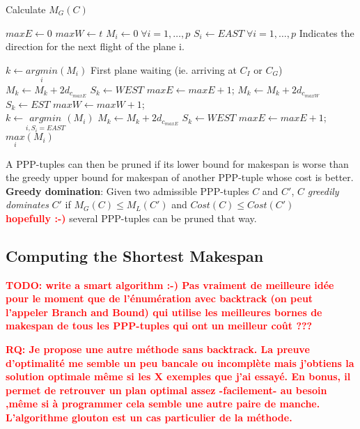 \documentclass[a4paper,11pt]{article}
\newcommand{\myred}[1]
{\textcolor{red}{\bf {#1}}
}
\begin{document}
\begin{algorithm}
\caption{Calculate $M_G(C)$}
\begin{algorithmic}
\STATE $maxE \leftarrow 0$
\STATE $maxW \leftarrow t$
\STATE $M_i \leftarrow 0 \; \forall i=1,\ldots,p$
\STATE $S_i \leftarrow EAST \; \forall i=1,\ldots,p$
\COMMENT Indicates the direction for the next flight of the plane i.

\STATE $k \leftarrow \underset{i}{argmin}(M_i)$ \COMMENT First plane waiting (ie. arriving at $C_I$ or $C_G$)
\STATE $M_k \leftarrow M_k + 2d_{c_{maxE}}$
\STATE $S_k \leftarrow WEST$
\STATE $maxE \leftarrow maxE + 1 $;
\ELSE
\STATE $M_k \leftarrow M_k + 2d_{c_{maxW}}$
\STATE $S_k \leftarrow EST$
\STATE $maxW \leftarrow maxW + 1 $;
\ENDIF
\ENDWHILE
\\
\STATE $k \leftarrow \underset{i, S_i=EAST}{argmin}(M_i)$
\STATE $M_k \leftarrow M_k + 2d_{c_{maxE}}$
\STATE $S_k \leftarrow WEST$
\STATE $maxE \leftarrow maxE + 1 $;
\ENDWHILE
\\
\RETURN $\underset{i}{max}(M_i)$
\end{algorithmic}
\end{algorithm}

A PPP-tuples can then be pruned if its lower bound for makespan is worse than the greedy upper bound for makespan of another PPP-tuple whose cost is better.\\

\noindent
{\bf Greedy domination}: Given two admissible PPP-tuples $C$ and $C'$, $C$ {\it greedily dominates} $C'$ if $M_G(C) \leq M_L(C')$ and $Cost(C) \leq Cost(C')$\\

\myred{hopefully :-)} several PPP-tuples can be pruned that way.

\subsection{Computing the Shortest Makespan}
\myred{TODO: write a smart algorithm :-) Pas vraiment de meilleure idée pour le moment que de l'énumération avec backtrack (on peut l'appeler Branch and Bound) qui utilise les meilleures bornes de makespan de tous les PPP-tuples qui ont un meilleur coût ???}

\myred{RQ: Je propose une autre méthode sans backtrack. La preuve d'optimalité me semble un peu bancale ou incomplète mais j'obtiens la solution optimale même si les X exemples que j'ai essayé. En bonus, il permet de retrouver un plan optimal assez -facilement- au besoin ,même si à programmer cela semble une autre paire de manche. L'algorithme glouton est un cas particulier de la méthode.}
\end{document}
